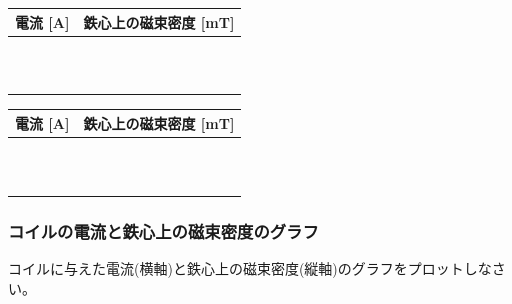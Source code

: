 \vspace{1cm}



\begin{center}
\begin{tabular}{|c|p{4.5cm}|}
\hline
電流 [A] & 鉄心上の磁束密度 [mT] \\
\hline
 &\\
\hline
 &\\
\hline
 &\\
\hline
&\\
\hline
&\\
\hline
&\\
\hline
&\\
\hline
&\\
\hline
&\\
\hline
&\\
\hline
&\\
\hline
\end{tabular}
\begin{tabular}{|c|p{4.5cm}|}
\hline
電流 [A] & 鉄心上の磁束密度 [mT] \\
\hline
&\\
\hline
&\\
\hline
&\\
\hline
&\\
\hline
&\\
\hline
&\\
\hline
&\\
\hline
&\\
\hline
&\\
\hline
&\\
\hline
&\\
\hline
\end{tabular}
\end{center}

\newpage





\subsubsection*{コイルの電流と鉄心上の磁束密度のグラフ}

\noindent
コイルに与えた電流(横軸)と鉄心上の磁束密度(縦軸)のグラフをプロットしなさい。

